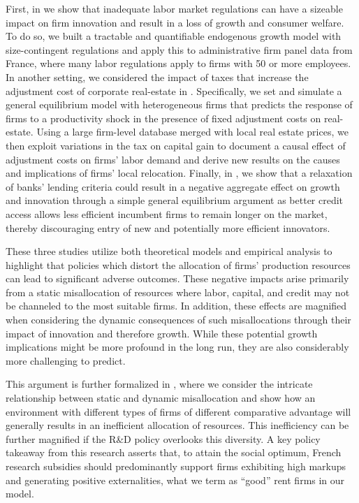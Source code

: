 \documentclass[12pt]{article}
\begin{document}
First, in \citet*{aghion2021impact} we show that inadequate labor market regulations can have a sizeable impact on firm innovation and result in a loss of growth and consumer welfare. To do so, we built a tractable and quantifiable endogenous growth model with size-contingent regulations and apply this to administrative firm panel data from France, where many labor regulations apply to firms with 50 or more employees. In another setting, we considered the impact of taxes that increase the adjustment cost of corporate real-estate in \citet*{bergeaud2021adjustment}. Specifically, we set and simulate a general equilibrium model with heterogeneous firms that predicts the response of firms to a productivity shock in the presence of fixed adjustment costs on real-estate. Using a large firm-level database merged with local real estate prices, we then exploit variations in the tax on capital gain to document a causal effect of adjustment costs on firms' labor demand and derive new results on the causes and implications of firms' local relocation. Finally, in \citet{aghion2019coase}, we show that a relaxation of banks' lending criteria could result in a negative aggregate effect on growth and innovation through a simple general equilibrium argument as better credit access allows less efficient incumbent firms to remain longer on the market, thereby discouraging entry of new and potentially more efficient innovators.

These three studies utilize both theoretical models and empirical analysis to highlight that policies which distort the allocation of firms' production resources can lead to significant adverse outcomes. These negative impacts arise primarily from a static misallocation of resources where labor, capital, and credit may not be channeled to the most suitable firms. In addition, these effects are magnified when considering the dynamic consequences of such misallocations through their impact of innovation and therefore growth. While these potential growth implications might be more profound in the long run, they are also considerably more challenging to predict.

This argument is further formalized in \citet*{aghion2022good}, where we consider the intricate relationship between static and dynamic misallocation and show how an environment with different types of firms of different comparative advantage will generally results in an inefficient allocation of resources. This inefficiency can be further magnified if the R\&D policy overlooks this diversity. A key policy takeaway from this research asserts that, to attain the social optimum, French research subsidies should predominantly support firms exhibiting high markups and generating positive externalities, what we term as ``good'' rent firms in our model. 
\end{document}
